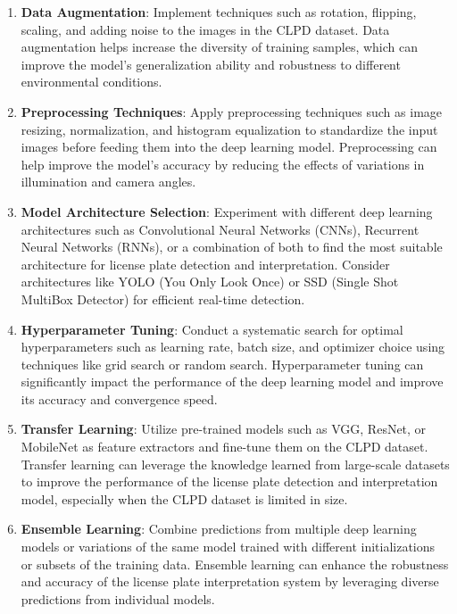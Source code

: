 	\begin{enumerate}[label=\arabic*.]
		\item \textbf{Data Augmentation}: Implement techniques such as rotation, flipping, scaling, and adding noise to the images in the CLPD dataset. Data augmentation helps increase the diversity of training samples, which can improve the model's generalization ability and robustness to different environmental conditions.
		
		\item \textbf{Preprocessing Techniques}: Apply preprocessing techniques such as image resizing, normalization, and histogram equalization to standardize the input images before feeding them into the deep learning model. Preprocessing can help improve the model's accuracy by reducing the effects of variations in illumination and camera angles.
		
		\item \textbf{Model Architecture Selection}: Experiment with different deep learning architectures such as Convolutional Neural Networks (CNNs), Recurrent Neural Networks (RNNs), or a combination of both to find the most suitable architecture for license plate detection and interpretation. Consider architectures like YOLO (You Only Look Once) or SSD (Single Shot MultiBox Detector) for efficient real-time detection.
		
		\item \textbf{Hyperparameter Tuning}: Conduct a systematic search for optimal hyperparameters such as learning rate, batch size, and optimizer choice using techniques like grid search or random search. Hyperparameter tuning can significantly impact the performance of the deep learning model and improve its accuracy and convergence speed.
		
		\item \textbf{Transfer Learning}: Utilize pre-trained models such as VGG, ResNet, or MobileNet as feature extractors and fine-tune them on the CLPD dataset. Transfer learning can leverage the knowledge learned from large-scale datasets to improve the performance of the license plate detection and interpretation model, especially when the CLPD dataset is limited in size.
		
		\item \textbf{Ensemble Learning}: Combine predictions from multiple deep learning models or variations of the same model trained with different initializations or subsets of the training data. Ensemble learning can enhance the robustness and accuracy of the license plate interpretation system by leveraging diverse predictions from individual models.
		

\end{enumerate}
